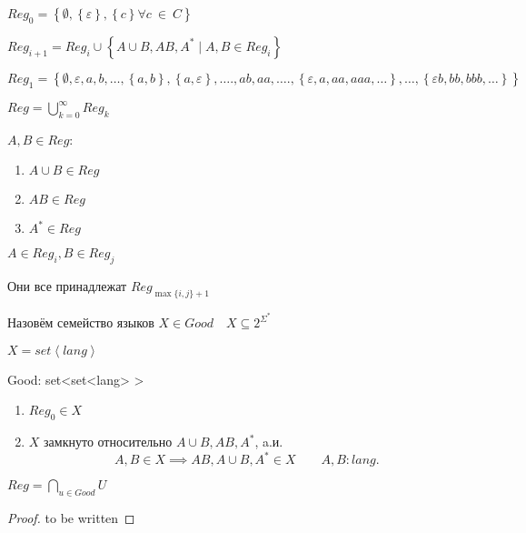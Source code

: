 \documentclass{book}
\renewcommand\O{\ensuremath{\emptyset}}
\theoremstyle{definition}
\begin{document}
\begin{definition}
    $Reg_0 = \left\{ \O, \left\{ \varepsilon \right\} , \left\{c\right\} \forall c\ \in \ C \right\} $

    $Reg_{i+1} = Reg_i \cup \left\{ A\cup B, AB, A^* \mid A, B\in Reg_i \right\} $ 

    $Reg_1 = \left\{ \O , \varepsilon, a, b, \ldots, \left\{a,b\right\}, \left\{a,\varepsilon\right\}, \ldots., {ab}, {aa}, \ldots., \left\{\varepsilon, a, aa, aaa, \ldots \right\} , \ldots, \left\{ \varepsilon b, bb, bbb, \ldots \right\}\right\} $

    $Reg = \bigcup\limits_{k=0}^{\infty }Reg_k$
\end{definition}

\begin{lemma}
    $A, B\in Reg$:
     \begin{enumerate}
        \item $A\cup B\in Reg$
        \item $AB\in Reg$
        \item  $A^*\in Reg$
    \end{enumerate}

    $A\in Reg_i, B\in Reg_j$

    Они все принадлежат $Reg_{\max\{i,j\}+1}$
\end{lemma}

\begin{definition}
    Назовём семейство языков $X\in Good\quad X\subseteq 2^{\Sigma^*}$

    $X = set\left<lang \right>$ 

    Good: set<set<lang> >
    \begin{enumerate}
        \item $Reg_0\in X$
        \item $X$ замкнуто относительно  $A\cup B, AB, A^*$, a.и. \[
        A, B\in X\implies AB, A\cup B, A^*\in X\qquad A,B:lang
        .\] 
    \end{enumerate}
\end{definition}

\begin{theorem}
    $Reg = \bigcap\limits_{u\in Good}U $
\end{theorem}
\begin{proof}
    to be written
\end{proof}
\end{document}
